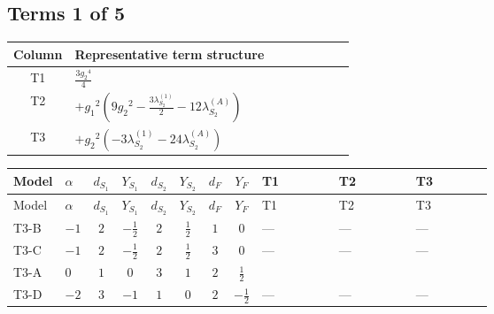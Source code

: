 \documentclass[8pt]{article}
\begin{document}
\begin{landscape}
\subsection*{Terms 1 of 5}
\begin{center}
\begin{tabular}{@{}c >{\raggedright\arraybackslash}p{0.82\linewidth}@{}}
\toprule
Column & Representative term structure \\
\midrule
T1 & \(\displaystyle \frac{3 {g_2}^4}{4}\) \\
\midrule
T2 & \(\displaystyle +{g_1}^2 \left(9 {g_2}^2-\frac{3 {\lambda_{S_2}^{(1)}}}{2}-12 {\lambda_{S_2}^{(A)}}\right)\) \\
\midrule
T3 & \(\displaystyle +{g_2}^2 (-3 {\lambda_{S_2}^{(1)}}-24 {\lambda_{S_2}^{(A)}})\) \\
\midrule
\bottomrule
\end{tabular}
\end{center}
\smallskip
\tiny
\begin{longtable}{@{}llcccccc >{\raggedright\arraybackslash}p{0.21\linewidth} >{\raggedright\arraybackslash}p{0.21\linewidth} >{\raggedright\arraybackslash}p{0.21\linewidth}@{}}
\toprule
Model & $\alpha$ & $d_{S_1}$ & $Y_{S_1}$ & $d_{S_2}$ & $Y_{S_2}$ & $d_F$ & $Y_F$ & T1 & T2 & T3 \\
\midrule
\endfirsthead
\toprule
Model & $\alpha$ & $d_{S_1}$ & $Y_{S_1}$ & $d_{S_2}$ & $Y_{S_2}$ & $d_F$ & $Y_F$ & T1 & T2 & T3 \\
\midrule
\endhead
T3-B & $-1$ & $2$ & $-\frac{1}{2}$ & $2$ & $\frac{1}{2}$ & $1$ & $0$ & --- & --- & --- \\
\midrule
T3-C & $-1$ & $2$ & $-\frac{1}{2}$ & $2$ & $\frac{1}{2}$ & $3$ & $0$ & --- & --- & --- \\
\midrule
T3-A & $0$ & $1$ & $0$ & $3$ & $1$ & $2$ & $\frac{1}{2}$ & \scriptsize\adjustbox{max width=\linewidth}{$\begin{gathered} \frac{3 {g_2}^4}{4}\end{gathered}$} & \scriptsize\adjustbox{max width=\linewidth}{$\begin{gathered} +{g_1}^2 \left(9 {g_2}^2-\frac{3 {\lambda_{S_2}^{(1)}}}{2}-12 {\lambda_{S_2}^{(A)}}\right)\end{gathered}$} & \scriptsize\adjustbox{max width=\linewidth}{$\begin{gathered} +{g_2}^2 (-3 {\lambda_{S_2}^{(1)}}-24 {\lambda_{S_2}^{(A)}})\end{gathered}$} \\
\midrule
T3-D & $-2$ & $3$ & $-1$ & $1$ & $0$ & $2$ & $-\frac{1}{2}$ & --- & --- & --- \\

\end{longtable}
\end{landscape}
\end{document}
